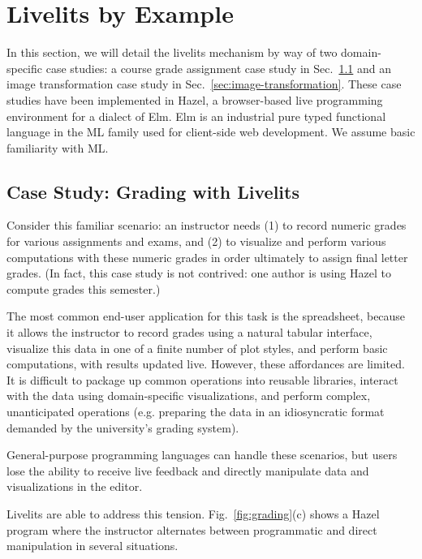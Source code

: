 \section{Livelits by Example}\label{sec:case-studies}


In this section, we will detail the livelits mechanism by way of  
two domain-specific case studies:
a course grade assignment case study in Sec.~\ref{sec:live-grading}
and an image transformation case study in Sec.~\ref{sec:image-transformation}.
These case studies have been implemented
in Hazel, a browser-based live programming environment for a dialect of Elm. 
Elm is an industrial pure typed functional language in the
ML family used for client-side web development. 
We assume basic familiarity with ML.

\subsection{Case Study: Grading with Livelits}\label{sec:live-grading}
Consider this familiar scenario: an instructor needs
(1) to record numeric grades for various assignments and exams, and
(2) to visualize and perform various computations with these numeric grades
in order ultimately to assign final letter grades.
(In fact, this case study is not contrived: one author is using Hazel to compute grades this semester.)

The most common end-user application for this task is the spreadsheet, because 
it allows the instructor to record grades using a natural tabular interface,
visualize this data in one of a finite number of plot styles, 
and perform basic computations,
with results updated live.
However, these affordances are limited. 
It is difficult to package up common operations 
into reusable libraries, interact with the data using domain-specific visualizations,
and perform complex, unanticipated operations 
(e.g. preparing the data in an idiosyncratic format demanded by the university's grading system).

General-purpose programming languages 
can handle these scenarios, but users 
lose the ability to receive live feedback and  
directly manipulate data and visualizations in the editor.

Livelits are able to address this tension.
Fig.~\ref{fig:grading}(c) shows a Hazel program where 
the instructor alternates between programmatic and direct manipulation in several situations.

